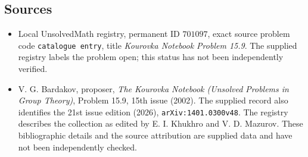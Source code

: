 \documentclass[11pt]{article}
\begin{document}
\subsection{Sources}
\begin{itemize}
\item Local UnsolvedMath registry, permanent ID \(701097\), exact source problem code \texttt{catalogue entry}, title \emph{Kourovka Notebook Problem 15.9}. The supplied registry labels the problem open; this status has not been independently verified.
\item V. G. Bardakov, proposer, \emph{The Kourovka Notebook (Unsolved Problems in Group Theory)}, Problem 15.9, 15th issue (2002). The supplied record also identifies the 21st issue edition (2026), \texttt{arXiv:1401.0300v48}. The registry describes the collection as edited by E. I. Khukhro and V. D. Mazurov. These bibliographic details and the source attribution are supplied data and have not been independently checked.
\end{itemize}
\end{document}

